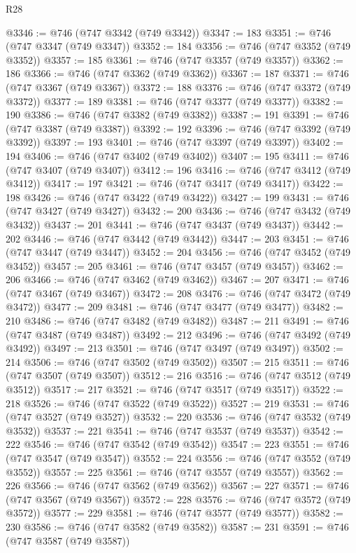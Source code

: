 \begin{lexlean}{R28}
\begin{coremodule}
@3346 := @746 (@747 @3342 (@749 @3342))
@3347 := 183
@3351 := @746 (@747 @3347 (@749 @3347))
@3352 := 184
@3356 := @746 (@747 @3352 (@749 @3352))
@3357 := 185
@3361 := @746 (@747 @3357 (@749 @3357))
@3362 := 186
@3366 := @746 (@747 @3362 (@749 @3362))
@3367 := 187
@3371 := @746 (@747 @3367 (@749 @3367))
@3372 := 188
@3376 := @746 (@747 @3372 (@749 @3372))
@3377 := 189
@3381 := @746 (@747 @3377 (@749 @3377))
@3382 := 190
@3386 := @746 (@747 @3382 (@749 @3382))
@3387 := 191
@3391 := @746 (@747 @3387 (@749 @3387))
@3392 := 192
@3396 := @746 (@747 @3392 (@749 @3392))
@3397 := 193
@3401 := @746 (@747 @3397 (@749 @3397))
@3402 := 194
@3406 := @746 (@747 @3402 (@749 @3402))
@3407 := 195
@3411 := @746 (@747 @3407 (@749 @3407))
@3412 := 196
@3416 := @746 (@747 @3412 (@749 @3412))
@3417 := 197
@3421 := @746 (@747 @3417 (@749 @3417))
@3422 := 198
@3426 := @746 (@747 @3422 (@749 @3422))
@3427 := 199
@3431 := @746 (@747 @3427 (@749 @3427))
@3432 := 200
@3436 := @746 (@747 @3432 (@749 @3432))
@3437 := 201
@3441 := @746 (@747 @3437 (@749 @3437))
@3442 := 202
@3446 := @746 (@747 @3442 (@749 @3442))
@3447 := 203
@3451 := @746 (@747 @3447 (@749 @3447))
@3452 := 204
@3456 := @746 (@747 @3452 (@749 @3452))
@3457 := 205
@3461 := @746 (@747 @3457 (@749 @3457))
@3462 := 206
@3466 := @746 (@747 @3462 (@749 @3462))
@3467 := 207
@3471 := @746 (@747 @3467 (@749 @3467))
@3472 := 208
@3476 := @746 (@747 @3472 (@749 @3472))
@3477 := 209
@3481 := @746 (@747 @3477 (@749 @3477))
@3482 := 210
@3486 := @746 (@747 @3482 (@749 @3482))
@3487 := 211
@3491 := @746 (@747 @3487 (@749 @3487))
@3492 := 212
@3496 := @746 (@747 @3492 (@749 @3492))
@3497 := 213
@3501 := @746 (@747 @3497 (@749 @3497))
@3502 := 214
@3506 := @746 (@747 @3502 (@749 @3502))
@3507 := 215
@3511 := @746 (@747 @3507 (@749 @3507))
@3512 := 216
@3516 := @746 (@747 @3512 (@749 @3512))
@3517 := 217
@3521 := @746 (@747 @3517 (@749 @3517))
@3522 := 218
@3526 := @746 (@747 @3522 (@749 @3522))
@3527 := 219
@3531 := @746 (@747 @3527 (@749 @3527))
@3532 := 220
@3536 := @746 (@747 @3532 (@749 @3532))
@3537 := 221
@3541 := @746 (@747 @3537 (@749 @3537))
@3542 := 222
@3546 := @746 (@747 @3542 (@749 @3542))
@3547 := 223
@3551 := @746 (@747 @3547 (@749 @3547))
@3552 := 224
@3556 := @746 (@747 @3552 (@749 @3552))
@3557 := 225
@3561 := @746 (@747 @3557 (@749 @3557))
@3562 := 226
@3566 := @746 (@747 @3562 (@749 @3562))
@3567 := 227
@3571 := @746 (@747 @3567 (@749 @3567))
@3572 := 228
@3576 := @746 (@747 @3572 (@749 @3572))
@3577 := 229
@3581 := @746 (@747 @3577 (@749 @3577))
@3582 := 230
@3586 := @746 (@747 @3582 (@749 @3582))
@3587 := 231
@3591 := @746 (@747 @3587 (@749 @3587))

\end{coremodule}
\end{lexlean}
